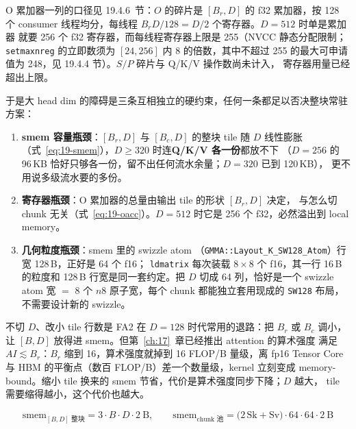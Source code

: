 O 累加器一列的口径见 19.4.6~节：$O$ 的碎片是 $[B_r, D]$ 的 f32 累加器，按 128 个
consumer 线程均分，每线程 $B_r D / 128 = D/2$ 个寄存器。$D = 512$ 时单是累加器
就要 256 个 f32 寄存器，而每线程寄存器上限是 255（NVCC 静态分配限制；\texttt{setmaxnreg}
的立即数须为 $[24,256]$ 内 8 的倍数，其中不超过 255 的最大可申请值为 248，见 19.4.4 节）。$S/P$ 碎片与 Q/K/V 操作数尚未计入，
寄存器用量已经超出上限。

于是大 head dim 的障碍是三条互相独立的硬约束，任何一条都足以否决整块常驻
方案：

\begin{enumerate}[itemsep=2pt,topsep=2pt]
  \item \textbf{smem 容量瓶颈}：$[B_r, D]$ 与 $[B_c, D]$ 的整块 tile 随 $D$ 线性膨胀
        （式~\ref{eq:19-smem}），$D \ge 320$ 时连\textbf{Q/K/V 各一份}都放不下
        （$D{=}256$ 的 96\,KB 恰好只够各一份，留不出任何流水余量；$D{=}320$ 已到
        120\,KB），
        更不用说多级流水要的多份。
  \item \textbf{寄存器瓶颈}：O 累加器的总量由输出 tile 的形状 $[B_r, D]$ 决定，
        与怎么切 chunk 无关（式~\ref{eq:19-oacc}）。$D = 512$ 时它是 256 个
        f32，必然溢出到 local memory。
  \item \textbf{几何粒度瓶颈}：smem 里的 swizzle atom
        （\texttt{GMMA::\allowbreak{}Layout\_\allowbreak{}K\_\allowbreak{}SW128\_\allowbreak{}Atom}）行宽 128\,B，正好是 64 个 f16；
        \texttt{ldmatrix} 每次装载 $8 \times 8$ 个 f16，其一行 16\,B 的粒度和
        128\,B 行宽是同一套约定。把 $D$ 切成 64 列，恰好是一个 swizzle atom
        宽 $=$ 8 个 $n8$ 原子宽，每个 chunk 都能独立套用现成的
        \texttt{SW128} 布局，不需要设计新的 swizzle。
\end{enumerate}

不切 $D$、改小 tile 行数是 FA2 在 $D=128$ 时代常用的退路：把 $B_r$ 或 $B_c$
调小，让 $[B, D]$ 放得进 smem。但第~\ref{ch:17}~章已经推出 attention 的算术强度
满足 $AI \lesssim B_r$：$B_r$ 缩到 16，算术强度就掉到 16 FLOP/B 量级，离
fp16 Tensor Core 与 HBM 的平衡点（数百 FLOP/B）差一个数量级，kernel 立刻变成
memory-bound。缩小 tile 换来的 smem 节省，代价是算术强度同步下降；$D$ 越大，
tile 需要缩得越小，这个代价也越大。

\begin{equation}
  \mathrm{smem}_{[B,D]\text{ 整块}} = 3 \cdot B \cdot D \cdot 2\ \text{B} ,
  \qquad
  \mathrm{smem}_{\text{chunk 池}} = \bigl(2\,\mathrm{Sk} + \mathrm{Sv}\bigr)\cdot 64 \cdot 64 \cdot 2\ \text{B}
  \label{eq:19-smem}
\end{equation}

